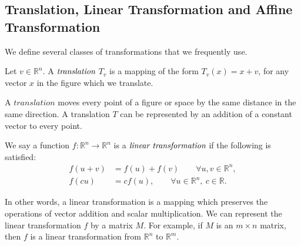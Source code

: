    \subsection{Translation, Linear Transformation and Affine Transformation}
      
      We define several classes of transformations that we frequently use.
      
      \begin{definition}
         Let $v\in\mathbb{R}^n$. A $\emph{translation}$ ${T}_v$ is a mapping of the form ${T}_v (x) = x + v$, for any vector $x$ in the figure which we translate.
      \end{definition}
      A $\textit{translation}$ moves every point of a figure or space by the same distance in the same direction. A translation ${T}$ can be represented by an addition of a constant vector to every point.


      \begin{definition}
      We say a function $\mathit{f}: \mathbb R^n \rightarrow\mathbb R^n$ is a $\emph{linear transformation}$ if the following is satisfied:
      \begin{align*}
      \mathit{f}(u + v) &= \mathit{f}(u) + \mathit{f}(v) \qquad \forall u, v \in\mathbb{R}^n,\\
      \mathit{f}(cu) &= c\mathit{f}(u), \qquad \forall u \in\mathbb R^n, ~c\in\mathbb R.
      \end{align*}
      \end{definition}
      In other words, a linear transformation is a mapping which preserves the operations of vector addition and scalar multiplication. We can represent the linear transformation ${f}$ by a matrix ${M}$. For example, if ${M}$ is an ${m} \times {n}$ matrix, then ${f}$ is a linear transformation from $\mathbb{R}^n$ to $\mathbb{R}^m$. 


